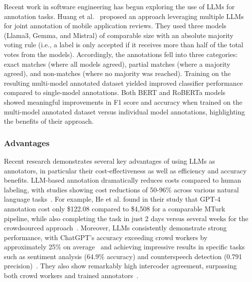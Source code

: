 \documentclass[11pt]{article}
\begin{document}
Recent work in software engineering has begun exploring the use of LLMs for annotation tasks.
Huang et al.~\cite{Huang2023Enhancing} proposed an approach leveraging multiple LLMs for joint annotation of mobile application reviews. 
They used three models (Llama3, Gemma, and Mistral) of comparable size  with an absolute majority voting rule (i.e., a label is only accepted if it receives more than half of the total votes from the models). 
Accordingly, the annotations fell into three categories: exact matches (where all models agreed), partial matches (where a majority agreed), and non-matches (where no majority was reached).
Training on the resulting multi-model annotated dataset yielded improved classifier performance compared to single-model annotations. Both BERT and RoBERTa models showed meaningful improvements in F1 score and accuracy when trained on the multi-model annotated dataset versus individual model annotations, highlighting the benefits of their approach.

\subsubsection{Advantages}

Recent research demonstrates several key advantages of using LLMs as annotators, in particular their cost-effectiveness as well as efficiency and accuracy benefits.
LLM-based annotation dramatically reduces costs compared to human labeling, with studies showing cost reductions of 50-96\% across various natural language tasks~\cite{DBLP:conf/emnlp/WangLXZZ21}.
For example, He et al. found in their study that GPT-4 annotation cost only \$122.08 compared to \$4,508 for a comparable MTurk pipeline, while also completing the task in just 2 days versus several weeks for the crowdsourced approach~\cite{DBLP:conf/chi/HeHDRH24}.
Moreover, LLMs consistently demonstrate strong performance, with ChatGPT's accuracy exceeding crowd workers by approximately 25\% on average~\cite{DBLP:journals/corr/abs-2303-15056} and achieving impressive results in specific tasks such as sentiment analysis (64.9\% accuracy) and counterspeech detection (0.791 precision)~\cite{DBLP:journals/corr/abs-2304-10145}. They also show remarkably high intercoder agreement, surpassing both crowd workers and trained annotators~\cite{DBLP:journals/corr/abs-2303-15056}.
\end{document}
